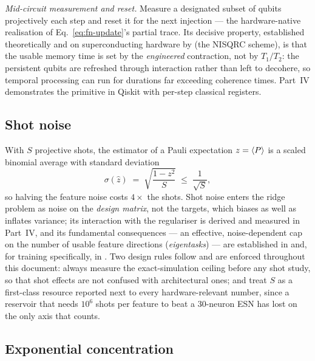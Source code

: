 \emph{Mid-circuit measurement and reset.} Measure a designated subset of
qubits projectively each step and reset it for the next injection --- the
hardware-native realisation of Eq.~\eqref{eq:fn-update}'s partial trace. Its
decisive property, established theoretically and on superconducting hardware
by \citet{hu2024overcoming} (the NISQRC scheme), is that the usable memory
time is set by the \emph{engineered} contraction, not by $T_1/T_2$: the
persistent qubits are refreshed through interaction rather than left to
decohere, so temporal processing can run for durations far exceeding
coherence times. Part~IV demonstrates the primitive in Qiskit with per-step
classical registers.

\subsection{Shot noise}
\label{sec:shot-noise}

With $S$ projective shots, the estimator of a Pauli expectation
$z = \langle P\rangle$ is a scaled binomial average with standard deviation
\begin{equation}
  \sigma(\hat z) \;=\; \sqrt{\frac{1-z^2}{S}} \;\le\; \frac{1}{\sqrt{S}},
  \label{eq:shot-noise}
\end{equation}
so halving the feature noise costs $4\times$ the shots. Shot noise enters the
ridge problem as noise on the \emph{design matrix}, not the targets, which
biases as well as inflates variance; its interaction with the regulariser is
derived and measured in Part~IV, and its fundamental consequences ---
an effective, noise-dependent cap on the number of usable feature directions
(\emph{eigentasks}) --- are established in
\citet{hu2023tackling} and, for training specifically, in
\citet{ahmed2025optimal}. Two design rules follow and are enforced throughout
this document: always measure the exact-simulation ceiling before any shot
study, so that shot effects are not confused with architectural ones; and
treat $S$ as a first-class resource reported next to every hardware-relevant
number, since a reservoir that needs $10^6$ shots per feature to beat a
\num{30}-neuron ESN has lost on the only axis that counts.

\subsection{Exponential concentration}
\label{sec:concentration}

